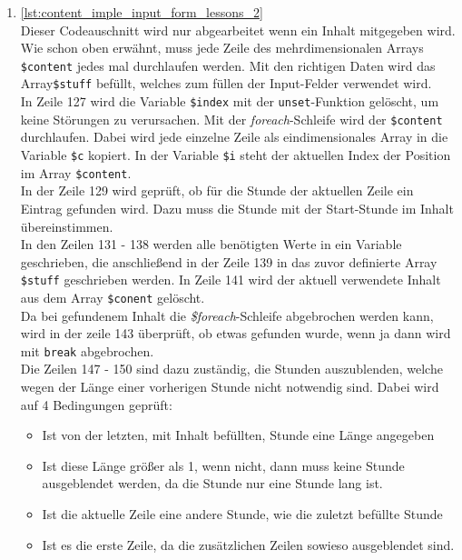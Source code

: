 \begin{enumerate}
	
	
	\item \autoref{lst:content_imple_input_form_lessons_2}\\
	Dieser Codeauschnitt wird nur abgearbeitet wenn ein Inhalt mitgegeben wird. Wie schon oben erwähnt, muss jede Zeile des mehrdimensionalen Arrays \texttt{\$content} jedes mal durchlaufen werden. Mit den richtigen Daten wird das Array\texttt{\$stuff} befüllt, welches zum füllen der Input-Felder verwendet wird.\\
	In Zeile 127 wird die Variable \texttt{\$index} mit der \texttt{unset}-Funktion gelöscht, um keine Störungen zu verursachen. Mit der \textit{foreach}-Schleife wird der \texttt{\$content} durchlaufen. Dabei wird jede einzelne Zeile als eindimensionales Array in die Variable \texttt{\$c} kopiert. In der Variable \texttt{\$i} steht der aktuellen Index der Position im Array \texttt{\$content}.\\
	In der Zeile 129 wird geprüft, ob für die Stunde der aktuellen Zeile ein Eintrag gefunden wird. Dazu muss die Stunde mit der Start-Stunde  im Inhalt übereinstimmen.\\
	In den Zeilen 131 - 138 werden alle benötigten Werte in ein Variable geschrieben, die anschließend in der Zeile 139 in das zuvor definierte Array \texttt{\$stuff} geschrieben werden.  In Zeile 141 wird der aktuell verwendete Inhalt aus dem Array \texttt{\$conent} gelöscht.\\ Da bei gefundenem Inhalt die \textit{\$foreach}-Schleife abgebrochen werden kann, wird in der zeile 143 überprüft, ob etwas gefunden wurde, wenn ja dann wird mit \texttt{break} abgebrochen.\\
	Die Zeilen 147 - 150 sind dazu zuständig, die Stunden auszublenden, welche wegen der Länge einer vorherigen Stunde nicht notwendig sind. Dabei wird auf 4 Bedingungen geprüft:
	
	\begin{itemize}
		\item Ist von der letzten, mit Inhalt befüllten, Stunde eine Länge angegeben
		\item Ist diese Länge größer als 1, wenn nicht, dann muss keine Stunde ausgeblendet werden, da die Stunde nur eine Stunde lang ist.
		\item Ist die aktuelle Zeile eine andere Stunde, wie die zuletzt befüllte Stunde
		\item Ist es die erste Zeile, da die zusätzlichen Zeilen sowieso ausgeblendet sind.
	\end{itemize}
	

\end{enumerate}
